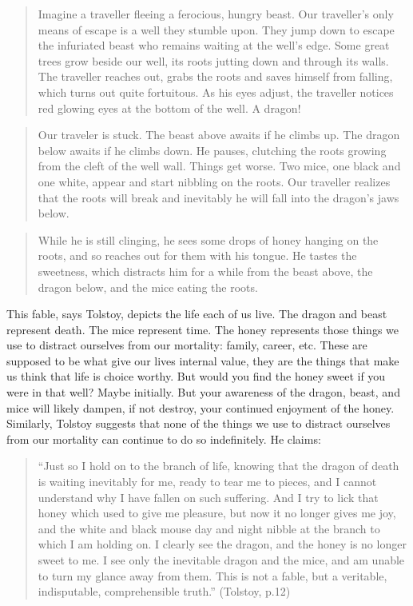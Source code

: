 \documentclass[10pt]{article}
\begin{document}
\begin{quote}
Imagine a traveller fleeing a ferocious, hungry beast. Our traveller's
only means of escape is a well they stumble upon. They jump down to
escape the infuriated beast who remains waiting at the well's edge. Some
great trees grow beside our well, its roots jutting down and through its
walls. The traveller reaches out, grabs the roots and saves himself from
falling, which turns out quite fortuitous. As his eyes adjust, the
traveller notices red glowing eyes at the bottom of the well. A dragon!
\end{quote}

\begin{quote}
Our traveler is stuck. The beast above awaits if he climbs up. The
dragon below awaits if he climbs down. He pauses, clutching the roots
growing from the cleft of the well wall. Things get worse. Two mice, one
black and one white, appear and start nibbling on the roots. Our
traveller realizes that the roots will break and inevitably he will fall
into the dragon's jaws below.
\end{quote}

\begin{quote}
While he is still clinging, he sees some drops of honey hanging on the
roots, and so reaches out for them with his tongue. He tastes the
sweetness, which distracts him for a while from the beast above, the
dragon below, and the mice eating the roots.
\end{quote}

This fable, says Tolstoy, depicts the life each of us live. The dragon
and beast represent death. The mice represent time. The honey represents
those things we use to distract ourselves from our mortality: family,
career, etc. These are supposed to be what give our lives internal
value, they are the things that make us think that life is choice
worthy. But would you find the honey sweet if you were in that well?
Maybe initially. But your awareness of the dragon, beast, and mice will
likely dampen, if not destroy, your continued enjoyment of the honey.
Similarly, Tolstoy suggests that none of the things we use to distract
ourselves from our mortality can continue to do so indefinitely. He
claims:

\begin{quote}
``Just so I hold on to the branch of life, knowing that the dragon of
death is waiting inevitably for me, ready to tear me to pieces, and I
cannot understand why I have fallen on such suffering. And I try to lick
that honey which used to give me pleasure, but now it no longer gives me
joy, and the white and black mouse day and night nibble at the branch to
which I am holding on. I clearly see the dragon, and the honey is no
longer sweet to me. I see only the inevitable dragon and the mice, and
am unable to turn my glance away from them. This is not a fable, but a
veritable, indisputable, comprehensible truth.'' (Tolstoy, p.12)
\end{quote}
\end{document}
